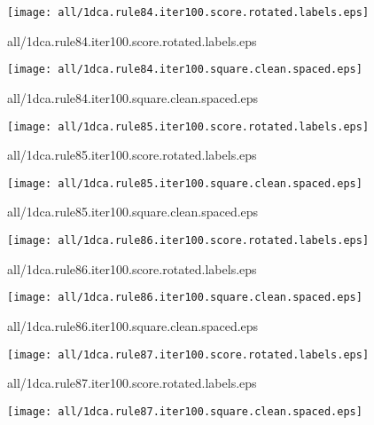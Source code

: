 \documentclass{article}
\begin{document}
\begin{center}
\begin{minipage}{\textwidth}
\texttt{[image: all/1dca.rule84.iter100.score.rotated.labels.eps]}
\end{minipage}
\end{center}
{\footnotesize all/1dca.rule84.iter100.score.rotated.labels.eps}
\begin{center}
\begin{minipage}{\textwidth}
\texttt{[image: all/1dca.rule84.iter100.square.clean.spaced.eps]}
\end{minipage}
\end{center}
{\footnotesize all/1dca.rule84.iter100.square.clean.spaced.eps}
\begin{center}
\begin{minipage}{\textwidth}
\texttt{[image: all/1dca.rule85.iter100.score.rotated.labels.eps]}
\end{minipage}
\end{center}
{\footnotesize all/1dca.rule85.iter100.score.rotated.labels.eps}
\begin{center}
\begin{minipage}{\textwidth}
\texttt{[image: all/1dca.rule85.iter100.square.clean.spaced.eps]}
\end{minipage}
\end{center}
{\footnotesize all/1dca.rule85.iter100.square.clean.spaced.eps}
\begin{center}
\begin{minipage}{\textwidth}
\texttt{[image: all/1dca.rule86.iter100.score.rotated.labels.eps]}
\end{minipage}
\end{center}
{\footnotesize all/1dca.rule86.iter100.score.rotated.labels.eps}
\begin{center}
\begin{minipage}{\textwidth}
\texttt{[image: all/1dca.rule86.iter100.square.clean.spaced.eps]}
\end{minipage}
\end{center}
{\footnotesize all/1dca.rule86.iter100.square.clean.spaced.eps}
\begin{center}
\begin{minipage}{\textwidth}
\texttt{[image: all/1dca.rule87.iter100.score.rotated.labels.eps]}
\end{minipage}
\end{center}
{\footnotesize all/1dca.rule87.iter100.score.rotated.labels.eps}
\begin{center}
\begin{minipage}{\textwidth}
\texttt{[image: all/1dca.rule87.iter100.square.clean.spaced.eps]}
\end{minipage}
\end{center}
\end{document}
